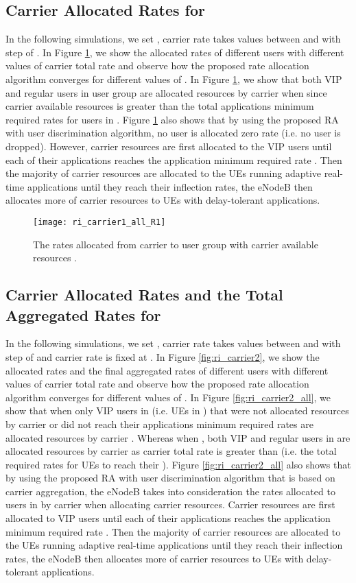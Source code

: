 \documentclass[journal]{IEEEtran} 				\IEEEoverridecommandlockouts 						\usepackage{amsmath,amssymb}
\begin{document}
\subsection{Carrier  Allocated Rates for }
In the following simulations, we set , carrier  rate  takes values between  and  with step of . In Figure \ref{fig:ri_carrier1_all_R1}, we show the allocated rates  of different users with different values of carrier  total rate  and observe how the proposed rate allocation algorithm converges for different values of . In Figure \ref{fig:ri_carrier1_all_R1}, we show that both VIP and regular users in user group  are allocated resources by carrier  when  since carrier  available resources  is greater than the total applications minimum required rates for users in . Figure \ref{fig:ri_carrier1_all_R1} also shows that by using the proposed RA with user discrimination algorithm, no user is allocated zero rate (i.e. no user is dropped). However, carrier  resources are first allocated to the VIP users until each of their applications reaches the application minimum required rate . Then the majority of carrier  resources are allocated to the UEs running adaptive real-time applications until they reach their inflection rates, the eNodeB then allocates more of carrier  resources to UEs with delay-tolerant applications.
\begin{figure}[tb]
\centering
\texttt{[image: ri\_carrier1\_all\_R1]}
\caption{The rates  allocated from carrier  to  user group with carrier  available resources .}
\label{fig:ri_carrier1_all_R1}
\end{figure}
\subsection{Carrier  Allocated Rates and the Total Aggregated Rates for }
In the following simulations, we set , carrier  rate  takes values between  and  with step of  and carrier  rate is fixed at . In Figure \ref{fig:ri_carrier2}, we show the allocated rates  and the final aggregated rates  of different users with different values of carrier  total rate  and observe how the proposed rate allocation algorithm converges for different values of . In Figure \ref{fig:ri_carrier2_all}, we show that when  only VIP users in  (i.e. UEs in ) that were not allocated resources by carrier  or did not reach their applications minimum required rates are allocated resources by carrier . Whereas when , both VIP and regular users in  are allocated resources by carrier  as carrier  total rate  is greater than  (i.e. the total required rates for UEs to reach their ). Figure \ref{fig:ri_carrier2_all} also shows that by using the proposed RA with user discrimination algorithm that is based on carrier aggregation, the eNodeB takes into consideration the rates allocated to users in  by carrier  when allocating carrier  resources. Carrier  resources are first allocated to VIP users until each of their applications reaches the application minimum required rate . Then the majority of carrier  resources are allocated to the UEs running adaptive real-time applications until they reach their inflection rates, the eNodeB then allocates more of carrier  resources to UEs with delay-tolerant applications.
\end{document}

